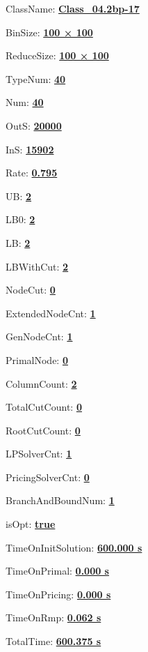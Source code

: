 \documentclass[11pt]{article}
\begin{document}
\pagestyle{empty}


ClassName: \underline{\textbf{Class_04.2bp-17}}
\par
BinSize: \underline{\textbf{100 × 100}}
\par
ReduceSize: \underline{\textbf{100 × 100}}
\par
TypeNum: \underline{\textbf{40}}
\par
Num: \underline{\textbf{40}}
\par
OutS: \underline{\textbf{20000}}
\par
InS: \underline{\textbf{15902}}
\par
Rate: \underline{\textbf{0.795}}
\par
UB: \underline{\textbf{2}}
\par
LB0: \underline{\textbf{2}}
\par
LB: \underline{\textbf{2}}
\par
LBWithCut: \underline{\textbf{2}}
\par
NodeCut: \underline{\textbf{0}}
\par
ExtendedNodeCnt: \underline{\textbf{1}}
\par
GenNodeCnt: \underline{\textbf{1}}
\par
PrimalNode: \underline{\textbf{0}}
\par
ColumnCount: \underline{\textbf{2}}
\par
TotalCutCount: \underline{\textbf{0}}
\par
RootCutCount: \underline{\textbf{0}}
\par
LPSolverCnt: \underline{\textbf{1}}
\par
PricingSolverCnt: \underline{\textbf{0}}
\par
BranchAndBoundNum: \underline{\textbf{1}}
\par
isOpt: \underline{\textbf{true}}
\par
TimeOnInitSolution: \underline{\textbf{600.000 s}}
\par
TimeOnPrimal: \underline{\textbf{0.000 s}}
\par
TimeOnPricing: \underline{\textbf{0.000 s}}
\par
TimeOnRmp: \underline{\textbf{0.062 s}}
\par
TotalTime: \underline{\textbf{600.375 s}}
\par
\newpage
\end{document}
